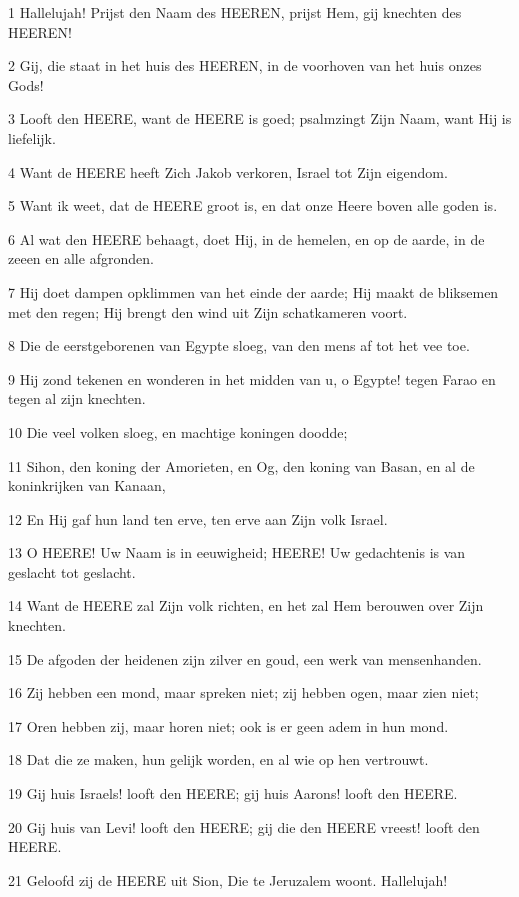 \par 1 Hallelujah! Prijst den Naam des HEEREN, prijst Hem, gij knechten des HEEREN!
\par 2 Gij, die staat in het huis des HEEREN, in de voorhoven van het huis onzes Gods!
\par 3 Looft den HEERE, want de HEERE is goed; psalmzingt Zijn Naam, want Hij is liefelijk.
\par 4 Want de HEERE heeft Zich Jakob verkoren, Israel tot Zijn eigendom.
\par 5 Want ik weet, dat de HEERE groot is, en dat onze Heere boven alle goden is.
\par 6 Al wat den HEERE behaagt, doet Hij, in de hemelen, en op de aarde, in de zeeen en alle afgronden.
\par 7 Hij doet dampen opklimmen van het einde der aarde; Hij maakt de bliksemen met den regen; Hij brengt den wind uit Zijn schatkameren voort.
\par 8 Die de eerstgeborenen van Egypte sloeg, van den mens af tot het vee toe.
\par 9 Hij zond tekenen en wonderen in het midden van u, o Egypte! tegen Farao en tegen al zijn knechten.
\par 10 Die veel volken sloeg, en machtige koningen doodde;
\par 11 Sihon, den koning der Amorieten, en Og, den koning van Basan, en al de koninkrijken van Kanaan,
\par 12 En Hij gaf hun land ten erve, ten erve aan Zijn volk Israel.
\par 13 O HEERE! Uw Naam is in eeuwigheid; HEERE! Uw gedachtenis is van geslacht tot geslacht.
\par 14 Want de HEERE zal Zijn volk richten, en het zal Hem berouwen over Zijn knechten.
\par 15 De afgoden der heidenen zijn zilver en goud, een werk van mensenhanden.
\par 16 Zij hebben een mond, maar spreken niet; zij hebben ogen, maar zien niet;
\par 17 Oren hebben zij, maar horen niet; ook is er geen adem in hun mond.
\par 18 Dat die ze maken, hun gelijk worden, en al wie op hen vertrouwt.
\par 19 Gij huis Israels! looft den HEERE; gij huis Aarons! looft den HEERE.
\par 20 Gij huis van Levi! looft den HEERE; gij die den HEERE vreest! looft den HEERE.
\par 21 Geloofd zij de HEERE uit Sion, Die te Jeruzalem woont. Hallelujah!

